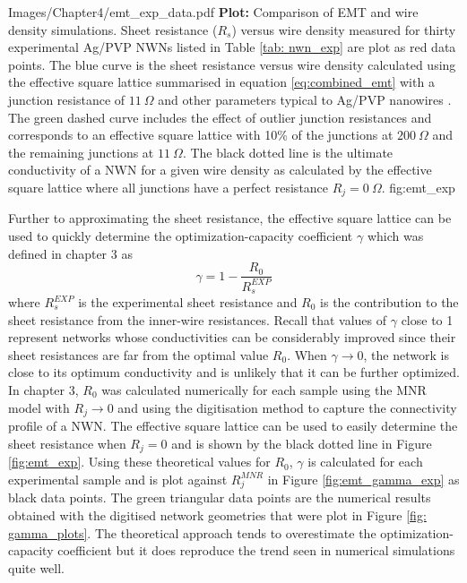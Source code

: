 {Images/Chapter4/emt_exp_data.pdf}
{\textbf{Plot:} Comparison of EMT and wire density simulations.}
{Sheet resistance ($R_s$) versus wire density measured for thirty experimental Ag/PVP NWNs listed in Table \ref{tab: nwn_exp} are plot as red data points. The blue curve is the sheet resistance versus wire density calculated using the effective square lattice summarised in equation \ref{eq:combined_emt} with a junction resistance of $11~ \Omega$ and other parameters typical to Ag/PVP nanowires \cite{rocha2015}. The green dashed curve includes the effect of outlier junction resistances and corresponds to an effective square lattice with 10\% of the junctions at $200~ \Omega$ and the remaining junctions at $11~ \Omega$. The black dotted line is the ultimate conductivity of a NWN for a given wire density as calculated by the effective square lattice where all junctions have a perfect resistance $R_j = 0~ \Omega$.}
{fig:emt_exp}

Further to approximating the sheet resistance, the effective square lattice can be used to quickly determine the optimization-capacity coefficient\cite{rocha2015} $\gamma$ which was defined in chapter 3 as
\begin{equation}
\gamma = 1 - \frac{R_0}{R_s^{EXP}}
\end{equation}
where $R_s^{EXP}$ is the experimental sheet resistance and $R_0$ is the contribution to the sheet resistance from the inner-wire resistances. Recall that values of $\gamma$ close to 1 represent networks whose conductivities can be considerably improved since their sheet resistances are far from the optimal value $R_0$. When $\gamma \rightarrow 0$, the network is close to its optimum conductivity and is unlikely that it can be further optimized. In chapter 3, $R_0$ was calculated numerically for each sample using the MNR model with $R_j \rightarrow 0$ and using the digitisation method to capture the connectivity profile of a NWN. The effective square lattice can be used to easily determine the sheet resistance when $R_j = 0$ and is shown by the black dotted line in Figure \ref{fig:emt_exp}. Using these theoretical values for $R_0$, $\gamma$ is calculated for each experimental sample and is plot against $R_j^{MNR}$ in Figure \ref{fig:emt_gamma_exp} as black data points. The green triangular data points are the numerical results obtained with the digitised network geometries that were plot in Figure \ref{fig: gamma_plots}. The theoretical approach tends to overestimate the optimization-capacity coefficient but it does reproduce the trend seen in numerical simulations quite well.

